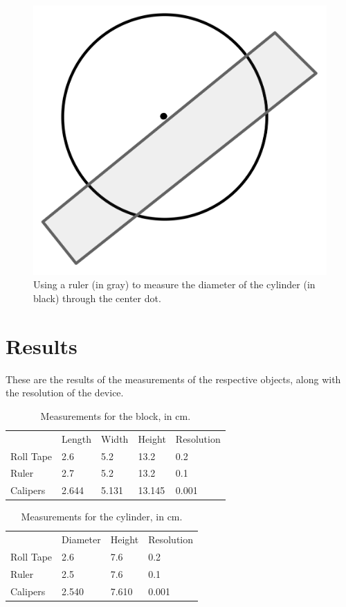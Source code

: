 \documentclass{article}
\begin{document}
\begin{figure}[!htbp]
	\centering
	\includegraphics[totalheight=6cm]{IMG_0623.jpeg}
	\caption{Using a ruler (in gray) to measure the diameter of the cylinder (in black) through the center dot.}
	\label{fig:ruler-cylinder}
\end{figure}


\section{Results}

These are the results of the measurements of the respective objects, along with the resolution of the device.

\begin{table}[!htbp]
	\centering
	\begin{tabular}{lllll}
		          & Length & Width & Height & Resolution \\
		Roll Tape & 2.6    & 5.2   & 13.2   & 0.2        \\
		Ruler     & 2.7    & 5.2   & 13.2   & 0.1        \\
		Calipers  & 2.644  & 5.131 & 13.145 & 0.001
	\end{tabular}
	\caption{Measurements for the block, in cm.}
	\label{block-table}
\end{table}

\begin{table}[!htbp]
	\centering
	\begin{tabular}{llll}
		          & Diameter & Height & Resolution \\
		Roll Tape & 2.6      & 7.6    & 0.2        \\
		Ruler     & 2.5      & 7.6    & 0.1        \\
		Calipers  & 2.540    & 7.610  & 0.001
	\end{tabular}
	\caption{Measurements for the cylinder, in cm.}
	\label{cylinder-table}
\end{table}
\end{document}
